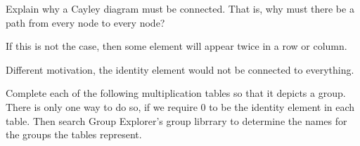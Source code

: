 \begin{questions}
	\question Explain why a Cayley diagram must be connected. That is, why must there be a path from every node to every node?
	\begin{solution}
		\par If this is not the case, then some element will appear twice in a row or column.
		\par Different motivation, the identity element would not be connected to everything.
	\end{solution}
	
	\question Complete each of the following multiplication tables so that it depicts a group. There is only one way to do so, if we require $0$ to be the identity element in each table. Then search Group Explorer's group librrary to determine the names for the groups the tables represent.
	\begin{solution}
\end{solution}
\end{questions}
